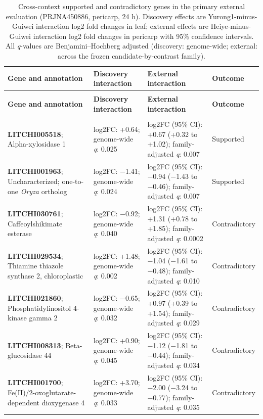 \documentclass[12pt,letterpaper]{article}
\begin{document}
\clearpage
\setlength{\tabcolsep}{5pt}
\begin{longtable}{@{}>{\raggedright\arraybackslash}p{}>{\raggedright\arraybackslash}p{}>{\raggedright\arraybackslash}p{}>{\raggedright\arraybackslash}p{}@{}}
\caption{Cross-context supported and contradictory genes in the primary external evaluation (PRJNA450886, pericarp, 24 h). Discovery effects are Yurong1-minus-Guiwei interaction log2 fold changes in leaf; external effects are Heiye-minus-Guiwei interaction log2 fold changes in pericarp with 95\% confidence intervals. All \textit{q}-values are Benjamini–Hochberg adjusted (discovery: genome-wide; external: across the frozen candidate-by-contrast family).} \\
\toprule
\textbf{Gene and annotation} & \textbf{Discovery interaction} & \textbf{External interaction} & \textbf{Outcome} \\
\midrule
\endfirsthead
\multicolumn{4}{l}{\textit{Table 3 continued}} \\
\toprule
\textbf{Gene and annotation} & \textbf{Discovery interaction} & \textbf{External interaction} & \textbf{Outcome} \\
\midrule
\endhead
\midrule \multicolumn{4}{r}{\textit{Continued on next page}} \\
\endfoot
\bottomrule
\endlastfoot
\textbf{LITCHI005518}; Alpha-xylosidase 1 & log2FC: +0.64; genome-wide \textit{q}: 0.025 & log2FC (95\% CI): +0.67 (+0.32 to +1.02); family-adjusted \textit{q}: 0.007 & Supported \\
\textbf{LITCHI001963}; Uncharacterized; one-to-one \textit{Oryza} ortholog & log2FC: −1.41; genome-wide \textit{q}: 0.024 & log2FC (95\% CI): −0.94 (−1.43 to −0.46); family-adjusted \textit{q}: 0.007 & Supported \\
\textbf{LITCHI030761}; Caffeoylshikimate esterase & log2FC: −0.92; genome-wide \textit{q}: 0.040 & log2FC (95\% CI): +1.31 (+0.78 to +1.85); family-adjusted \textit{q}: 0.0002 & Contradictory \\
\textbf{LITCHI029534}; Thiamine thiazole synthase 2, chloroplastic & log2FC: +1.48; genome-wide \textit{q}: 0.002 & log2FC (95\% CI): −1.04 (−1.61 to −0.48); family-adjusted \textit{q}: 0.010 & Contradictory \\
\textbf{LITCHI021860}; Phosphatidylinositol 4-kinase gamma 2 & log2FC: −0.65; genome-wide \textit{q}: 0.032 & log2FC (95\% CI): +0.97 (+0.39 to +1.54); family-adjusted \textit{q}: 0.029 & Contradictory \\
\textbf{LITCHI008313}; Beta-glucosidase 44 & log2FC: +0.90; genome-wide \textit{q}: 0.045 & log2FC (95\% CI): −1.12 (−1.81 to −0.44); family-adjusted \textit{q}: 0.034 & Contradictory \\
\textbf{LITCHI001700}; Fe(II)/2-oxoglutarate-dependent dioxygenase 4 & log2FC: +3.70; genome-wide \textit{q}: 0.033 & log2FC (95\% CI): −2.00 (−3.24 to −0.77); family-adjusted \textit{q}: 0.035 & Contradictory \\
\end{longtable}
\end{document}
